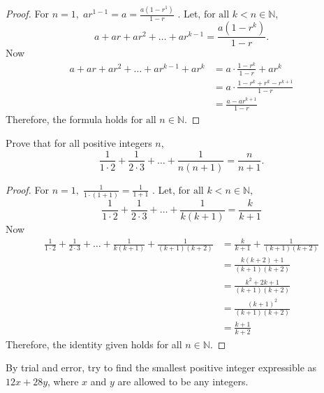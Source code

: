 \documentclass[12pt]{article}
\newenvironment{problem}[2][Problem]{\begin{trivlist}
\item[\hskip \labelsep {\bfseries #1}\hskip \labelsep {\bfseries #2.}]}{\end{trivlist}}
\begin{document}
\begin{proof}
	For $n = 1, \; ar^{1-1} = a = \frac{a(1-r^1)}{1-r}$ .
	Let, $\text{for all } k < n \in \mathbb{N}$,
	\[
		a + ar + ar^2 + \dots + ar^{k-1} = \frac{a(1 - r^k)}{1 - r}.
	\]
	Now
	\begin{align*}
		a + ar + ar^2 + \dots + ar^{k-1} + ar^k & = a \cdot \frac{1 - r^k}{1 - r} + ar^k          \\
		                                        & = a \cdot \frac{1 - r^k + r^k - r^{k+1}}{1 - r} \\
		                                        & = \frac{a - ar^{k+1}}{1 - r}
	\end{align*}
	Therefore, the formula holds $\text{for all } n \in \mathbb{N}$.

\end{proof}

\begin{problem}{8}
Prove that for all positive integers \( n \),
\[
	\frac{1}{1 \cdot 2} + \frac{1}{2 \cdot 3} + \dots + \frac{1}{n(n + 1)} = \frac{n}{n + 1}.
\]

\end{problem}

\begin{proof}
	For $n = 1, \; \frac{1}{1 \cdot (1+1)} = \frac{1}{1 + 1}$ .
	Let, $\text{for all } k < n \in \mathbb{N}$,
	\[
		\frac{1}{1 \cdot 2} + \frac{1}{2 \cdot 3} + \dots + \frac{1}{k(k + 1)} = \frac{k}{k + 1}
	\]
	Now
	\begin{align*}
		\frac{1}{1 \cdot 2} + \frac{1}{2 \cdot 3} + \dots + \frac{1}{k(k + 1)} + \frac{1}{(k+1)(k+2)}
		 & = \frac{k}{k + 1} + \frac{1}{(k+1)(k+2)} \\
		 & = \frac{k(k+2) + 1}{(k+1)(k+2)}          \\
		 & = \frac{k^2 + 2k + 1}{(k+1)(k+2)}        \\
		 & = \frac{(k+1)^2}{(k+1)(k+2)}             \\
		 & = \frac{k + 1}{k + 2}
	\end{align*}
	Therefore, the identity given holds for all $n \in \mathbb{N}$.

\end{proof}

\begin{problem}{9}
By trial and error, try to find the smallest positive integer expressible as \( 12x + 28y \),
where \( x \) and \( y \) are allowed to be any integers.

\end{problem}
\end{document}
